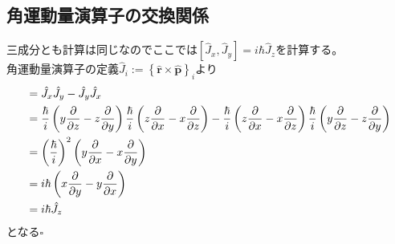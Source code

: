 \documentclass{jsarticle}  %
\numberwithin{equation}{section} %
\numberwithin{figure}{section}
\begin{document}
\subsection{角運動量演算子の交換関係}
    三成分とも計算は同じなのでここでは$[\hat{J}_x,\hat{J}_y]=i\hbar \hat{J}_z$を計算する。\\
    角運動量演算子の定義$\hat{J}_i := \left\{ \hat{\bm{r}}\times\hat{\bm{p}} \right\}_i$より
    \begin{align}
        [\hat{J}_x,\hat{J}_y] &= \hat{J}_x \hat{J}_y - \hat{J}_y \hat{J}_x \notag \\
        &= \frac{\hbar}{i}\left( y\frac{\partial }{\partial z} -z\frac{\partial}{\partial y} \right)\frac{\hbar}{i}\left( z\frac{\partial }{\partial x} -x\frac{\partial}{\partial z} \right) -\frac{\hbar}{i}\left( z\frac{\partial }{\partial x} -x\frac{\partial}{\partial z} \right) \frac{\hbar}{i}\left( y\frac{\partial }{\partial z} -z\frac{\partial}{\partial y} \right) \notag \\
        &= \left( \frac{\hbar}{i} \right)^2 \left( y\frac{\partial}{\partial x} - x\frac{\partial }{\partial y}  \right) \notag \\
        &= i\hbar \left( x\frac{\partial }{\partial y} - y\frac{\partial}{\partial x} \right) \notag \\
        &= i\hbar \hat{J}_z
    \end{align}
    となる$\square$
\end{document}
